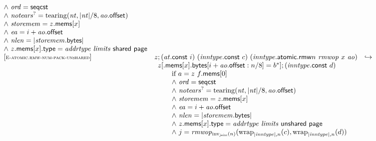 $$\begin{array}[t]{@{}lrcl@{}l@{}}
{\begin{array}[t]{@{}l@{}}
{\land}~ {\mathit{ord}} = \mathsf{seqcst} \\
{\land}~ {{\mathit{notears}}^?} = {\mathrm{tearing}}({\mathit{nt}}, {|{\mathit{nt}}|} / 8, {\mathit{ao}}{.}\mathsf{offset}) \\
{\land}~ {\mathit{storemem}} = z{.}\mathsf{mems}{}[x] \\
{\land}~ {\mathit{ea}} = i + {\mathit{ao}}{.}\mathsf{offset} \\
{\land}~ {\mathit{nlen}} = {|{\mathit{storemem}}{.}\mathsf{bytes}|} \\
{\land}~ z{.}\mathsf{mems}{}[x]{.}\mathsf{type} = {\mathit{addrtype}}~{\mathit{limits}}~\mathsf{shared}~\mathsf{page} \\
\end{array}
} \\
{[\textsc{\scriptsize E{-}atomic.rmw{-}num{-}pack{-}unshared}]} \quad & z ; ({\mathit{at}}{.}\mathsf{const}~i)~({\mathit{inntype}}{.}\mathsf{const}~c)~({{\mathit{inntype}}{.}\mathsf{atomic}{.}\mathsf{rmw}}{n}~{\mathit{rmwop}}~x~{\mathit{ao}}) & \hookrightarrow & & \\
& \multicolumn{4}{@{}l@{}}{\quad
\begin{array}[t]{@{}l@{}l@{}l@{}}
z{}[{.}\mathsf{mems}{}[x]{.}\mathsf{bytes}{}[i + {\mathit{ao}}{.}\mathsf{offset} : n / 8] = {b^\ast}] ; ({\mathit{inntype}}{.}\mathsf{const}~d) & & \\
 \multicolumn{3}{@{}l@{}}{\quad
\begin{array}[t]{@{}l@{}}
\quad
\begin{array}[t]{@{}l@{}}
\mbox{if}~ a = z~f{.}\mathsf{mems}{}[0] \\
{\land}~ {\mathit{ord}} = \mathsf{seqcst} \\
{\land}~ {{\mathit{notears}}^?} = {\mathrm{tearing}}({\mathit{nt}}, {|{\mathit{nt}}|} / 8, {\mathit{ao}}{.}\mathsf{offset}) \\
{\land}~ {\mathit{storemem}} = z{.}\mathsf{mems}{}[x] \\
{\land}~ {\mathit{ea}} = i + {\mathit{ao}}{.}\mathsf{offset} \\
{\land}~ {\mathit{nlen}} = {|{\mathit{storemem}}{.}\mathsf{bytes}|} \\
{\land}~ z{.}\mathsf{mems}{}[x]{.}\mathsf{type} = {\mathit{addrtype}}~{\mathit{limits}}~\mathsf{unshared}~\mathsf{page} \\
{\land}~ j = {{\mathit{rmwop}}}{{}_{{\mathrm{inv}}_{\mathit{jsize}}(n)}({{\mathrm{wrap}}}_{{|{\mathit{inntype}}|}, n}(c), {{\mathrm{wrap}}}_{{|{\mathit{inntype}}|}, n}(d))} \\

\end{array}
\end{array}}
\end{array}}
\end{array}$$

